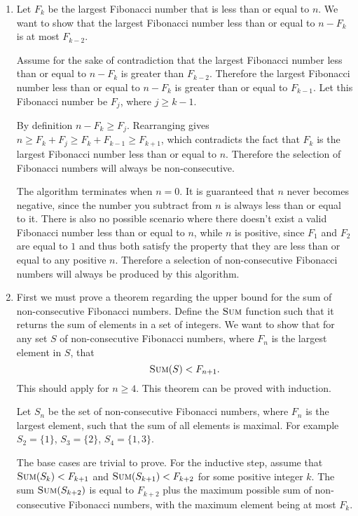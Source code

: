 \documentclass{article}
\begin{document}
\begin{solution}
\begin{enumerate}[label = (\alph*)]
    \item 
    Let $F_k$ be the largest Fibonacci number that is less than or equal to $n$.
    We want to show that the largest Fibonacci number less than or equal to $n-F_k$ is at most $F_{k-2}$.

    Assume for the sake of contradiction that the largest Fibonacci number less than or equal to $n-F_k$ is greater than $F_{k-2}$. 
    Therefore the largest Fibonacci number less than or equal to $n-F_k$
    is greater than or equal to $F_{k-1}$. Let this Fibonacci number be $F_j$, where $j\geq k-1$.

    By definition $n - F_k\geq F_j$. Rearranging gives $n \geq F_k + F_j \geq F_k + F_{k-1} \geq F_{k+1}$, which contradicts the fact that $F_k$ is the largest
    Fibonacci number less than or equal to $n$. Therefore the selection of Fibonacci numbers will always be non-consecutive.

    The algorithm terminates when $n = 0$.
    It is guaranteed that $n$ never becomes negative, since the number you subtract from $n$ is always less than or equal to it. 
    There is also no possible scenario where there doesn't exist a valid Fibonacci number less than or equal to $n$, while $n$ is positive, since $F_1$ and $F_2$ are equal to $1$ and thus both satisfy the property that they are less than or equal to any positive $n$. 
    Therefore a selection of non-consecutive Fibonacci numbers will always be produced by this algorithm.
    
    \item First we must prove a theorem regarding the upper bound for the sum of non-consecutive Fibonacci numbers. 
    Define the $\textsc{Sum}$ function such that it returns the sum of elements in a set of integers.
    We want to show that for any set $S$ of non-consecutive Fibonacci numbers, where $F_{n}$ is the largest element in $S$, that 
    $$\textsc{Sum}(S) < F_{n+1}.$$
    This should apply for $n \geq 4$.
    This theorem can be proved with induction.

    Let $S_n$ be the set of non-consecutive Fibonacci numbers, where $F_{n}$ is the largest element, such that the sum of all elements is maximal. 
    For example $S_2=\{1\}$, $S_3=\{2\}$, $S_4=\{1, 3\}$. 

    The base cases are trivial to prove. For the inductive step, assume that 
    $\textsc{Sum}(S_k) < F_{k+1}$ and $\textsc{Sum}(S_{k+1}) < F_{k+2}$ for 
    some positive integer $k$. 
    The sum $\textsc{Sum}(S_{k+2})$ is equal to $F_{k+2}$ plus the 
    maximum possible sum of non-consecutive Fibonacci numbers, 
    with the maximum element being at most $F_{k}$.


\end{enumerate}
\end{solution}
\end{document}
